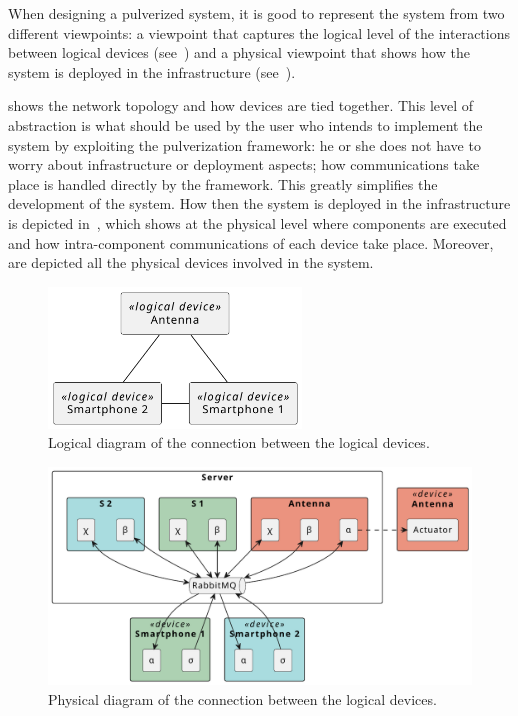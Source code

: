 When designing a pulverized system, it is good to represent the system from two different viewpoints: a viewpoint that captures the logical level
of the interactions between logical devices (see~) and a physical viewpoint that shows how the system is deployed in
the infrastructure (see~).

 shows the network topology and how devices are tied together. This level of abstraction is what should be used by
the user who intends to implement the system by exploiting the pulverization framework: he or she does not have to worry about infrastructure or
deployment aspects; how communications take place is handled directly by the framework. This greatly simplifies the development of the system. How
then the system is deployed in the infrastructure is depicted in~, which shows at the physical level where
components are executed and how intra-component communications of each device take place. Moreover, are depicted all the physical devices involved in
the system.

\begin{figure}
	\centering
	\includegraphics[width=0.6\textwidth]{figures/demo2-logical-device.pdf}
	\caption{Logical diagram of the connection between the logical devices.}
	\label{fig:demo-2-logical-diagram}
\end{figure}

\begin{figure}
	\centering
	\includegraphics[width=\textwidth]{figures/demo2-physical.pdf}
	\caption{Physical diagram of the connection between the logical devices.}
	\label{fig:demo-2-physical-diagram}
\end{figure}

